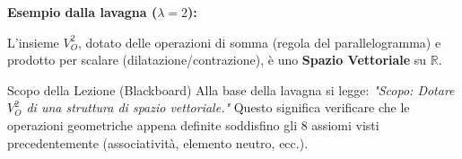 \textbf{Esempio dalla lavagna ($\lambda = 2$):}

\begin{center}
\end{center}

\begin{tcolorbox}[colback=white, colframe=cherryRed, title=Affermazione (AFF)]
L'insieme $V_O^2$, dotato delle operazioni di somma (regola del parallelogramma) e prodotto per scalare (dilatazione/contrazione), è uno \textbf{Spazio Vettoriale} su $\mathbb{R}$.
\end{tcolorbox}

\begin{observation}{Scopo della Lezione (Blackboard)}{}
Alla base della lavagna si legge:
\textit{"Scopo: Dotare $V_O^2$ di una struttura di spazio vettoriale."} 
Questo significa verificare che le operazioni geometriche appena definite soddisfino gli 8 assiomi visti precedentemente (associatività, elemento neutro, ecc.).
\end{observation}

\restoregeometry
